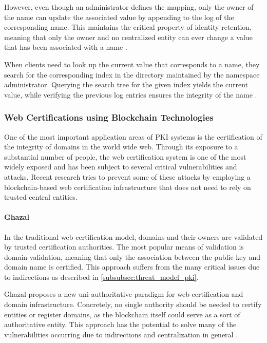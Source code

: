 However, even though an administrator defines the mapping, only the owner of the name can update the associated value by appending to the log of the corresponding name. This maintains the critical property of identity retention, meaning that only the owner and no centralized entity can ever change a value that has been associated with a name \cite{dong_bitforest:_2018}.

When clients need to look up the current value that corresponds to a name, they search for the corresponding index in the directory maintained by the namespace administrator. Querying the search tree for the given index yields the current value, while verifying the previous log entries ensures the integrity of the name \cite{dong_bitforest:_2018}.


\subsubsection{Web Certifications using Blockchain Technologies}

One of the most important application areas of PKI systems is the certification of the integrity of domains in the world wide web. Through its exposure to a substantial number of people, the web certification system is one of the most widely exposed and has been subject to several critical vulnerabilities and attacks. Recent research tries to prevent some of these attacks by employing a blockchain-based web certification infrastructure that does not need to rely on trusted central entities.

\paragraph{Ghazal}

In the traditional web certification model, domains and their owners are validated by trusted certification authorities. The most popular means of validation is domain-validation, meaning that only the association between the public key and domain name is certified. This approach suffers from the many critical issues due to indirections as described in \ref{subsubsec:threat_model_pki}.

Ghazal proposes a new uni-authoritative paradigm for web certification and domain infrastructure. Concretely, no single authority should be needed to certify entities or register domains, as the blockchain itself could serve as a sort of authoritative entity. This approach has the potential to solve many of the vulnerabilities occurring due to indirections and centralization in general \cite{zohar_ghazal:_2019}.

